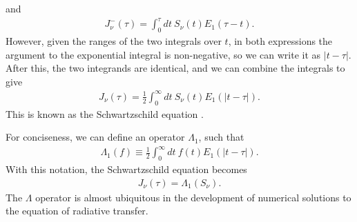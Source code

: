 and
\begin{align}
J_\nu^-(\tau)=
\int_0^{\tau}\!\!\!dt\:
S_\nu(t)
E_1(\tau-t).
\end{align}
However, given the ranges of the two integrals over
$t$, in both expressions the argument to the
exponential integral is non-negative, so we can write it as
$|t-\tau|$. After this, the two integrands are
identical, and we can combine the integrals to give
\begin{align}
J_\nu(\tau) = \frac{1}{2} \int_0^\infty\!\!\!dt\:
S_\nu(t)
E_1(|t-\tau|).
\end{align}
This is known as the Schwartzschild equation \cite{Schwarzschild-1914}. 

%

For conciseness, we can define an operator $\Lambda_1$, such
that
\begin{align}
\Lambda_1(f) \equiv \frac{1}{2} \int_0^\infty\!\!\!dt\:
f(t)
E_1(|t-\tau|).
\end{align}
With this notation, the Schwartzschild equation becomes
\begin{align}
J_\nu(\tau) = \Lambda_1(S_\nu).
\end{align}
The $\Lambda$ operator is almost ubiquitous in the development of
numerical solutions to the equation of radiative transfer.

